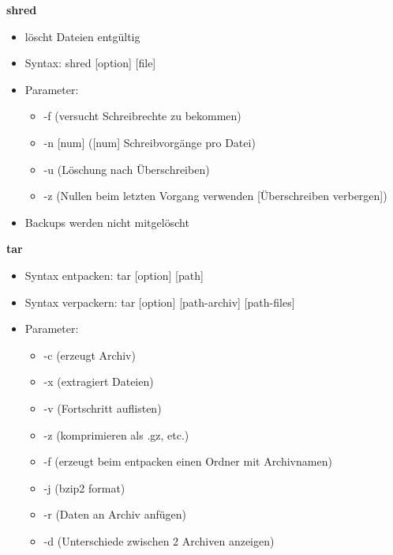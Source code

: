 \documentclass{article}
\begin{document}
\textbf{shred}
\begin{itemize}
	\item löscht Dateien entgültig
	\item Syntax: shred [option] [file]
	\item Parameter:
	\begin{itemize}
		\item -f (versucht Schreibrechte zu bekommen)
		\item -n [num] ([num] Schreibvorgänge pro Datei)
		\item -u (Löschung nach Überschreiben)
		\item -z (Nullen beim letzten Vorgang verwenden [Überschreiben verbergen])
	\end{itemize}
	\item Backups werden nicht mitgelöscht
\end{itemize}

\textbf{tar}
\begin{itemize}
	\item Syntax entpacken: tar [option] [path]
	\item Syntax verpackern: tar [option] [path-archiv] [path-files]
	\item Parameter:
	\begin{itemize}
		\item -c (erzeugt Archiv)
		\item -x (extragiert Dateien)
		\item -v (Fortschritt auflisten)
		\item -z (komprimieren als .gz, etc.)
		\item -f (erzeugt beim entpacken einen Ordner mit Archivnamen)
		\item -j (bzip2 format)
		\item -r (Daten an Archiv anfügen)
		\item -d (Unterschiede zwischen 2 Archiven anzeigen)
	\end{itemize}
\end{itemize}
\end{document}
